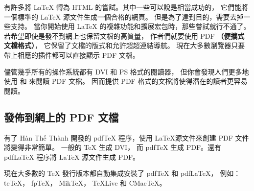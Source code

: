 有許多將 \LaTeX{} 轉為 HTML 的嘗試。其中一些可以說是相當成功的，
它們能將一個標準的 \LaTeX{} 源文件生成一個合格的網頁。
但是為了達到目的，需要去掉一些支持。
當你開始使用 \LaTeX{} 的複雜功能和擴展宏包時，那些嘗試就行不通了。
若希望即使是發不到網上也保留文檔的高質量，
作者們就要使用 PDF \textbf{（便攜式文檔格式）}，
它保留了文檔的版式和允許超超連結導航。
現在大多數瀏覽器只要帶上相應的插件都可以直接顯示 PDF 文檔。


儘管幾乎所有的操作系統都有 DVI 和 PS 格式的閱讀器，
但你會發現人們更多地使用  和  來閱讀 PDF 文檔。
因而提供 PDF 格式的文檔將使得潛在的讀者更容易閱讀。


\subsection{發佈到網上的 PDF 文檔}


有了 H\`an Th\'{\^e} Th\`anh 開發的 pdf\TeX{} 程序，使用 \LaTeX 源文件來創建 PDF 文件將變得非常簡單。
一般的 TeX{} 生成 DVI，
而 pdf\TeX{} 生成 PDF。還有 pdf\LaTeX{} 程序將 LaTeX{} 源文件生成 PDF。


現在大多數的 \TeX{} 發行版本都自動集成安裝了 pdf\TeX{} 和 pdf\LaTeX{}，
例如： te\TeX{}， fp\TeX{}， Mik\TeX{}， \TeX{}Live 和 CMac\TeX{}。


